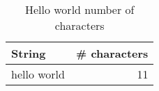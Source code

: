 \begin{table}[H]

\caption{\label{tab:hello}Hello world number of characters}
\centering
\begin{tabular}[t]{lr}
\toprule
String & \# characters\\
\midrule
hello world & 11\\
\bottomrule
\end{tabular}
\end{table}

